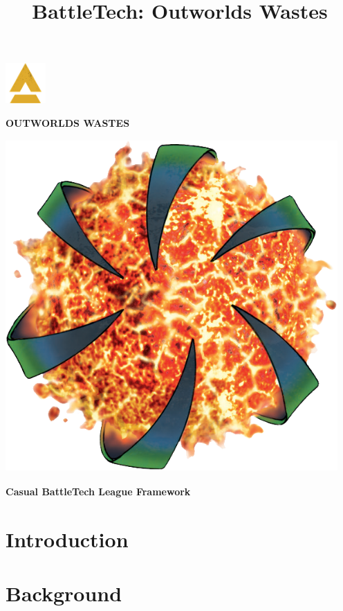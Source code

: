 \documentclass{article}
\title{BattleTech: Outworlds Wastes}
\author{}
\date{}
\newcommand{\sectiontitle}{}
\newcommand{\newsection}[2]{\renewcommand{\sectiontitle}{#2}\section{#1}}
\begin{document}
\makeatletter
{}

\begin{center}
  \fontsize{50}{60}\bfseries{}\includegraphics[alt='a', width=0.6in, height=0.6in]{img/Battletech-A.png}\fontsize{50}{60}\bfseries{}

  \fontsize{35}{42}\bfseries\selectfont\MakeUppercase{Outworlds Wastes}

  \includegraphics[alt='Outworlds Alliance logo', width=5in, height=5in]{img/Outworlds-Alliance.png}

  \LARGE\bfseries{Casual BattleTech League Framework}
\end{center}

\newsection{Introduction}{introduction}



\newpage

\newsection{Background}{background}
\end{document}
